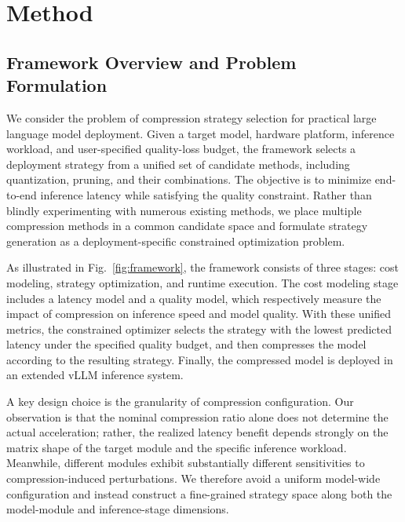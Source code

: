 \documentclass[letterpaper]{article} %
\begin{document}



\section{Method}
\subsection{Framework Overview and Problem Formulation}

We consider the problem of compression strategy selection for practical large language model deployment. Given a target model, hardware platform, inference workload, and user-specified quality-loss budget, the framework selects a deployment strategy from a unified set of candidate methods, including quantization, pruning, and their combinations. The objective is to minimize end-to-end inference latency while satisfying the quality constraint. Rather than blindly experimenting with numerous existing methods, we place multiple compression methods in a common candidate space and formulate strategy generation as a deployment-specific constrained optimization problem.

As illustrated in Fig.~\ref{fig:framework}, the framework consists of three stages: cost modeling, strategy optimization, and runtime execution. The cost modeling stage includes a latency model and a quality model, which respectively measure the impact of compression on inference speed and model quality. With these unified metrics, the constrained optimizer selects the strategy with the lowest predicted latency under the specified quality budget, and then compresses the model according to the resulting strategy. Finally, the compressed model is deployed in an extended vLLM inference system.

A key design choice is the granularity of compression configuration. Our observation is that the nominal compression ratio alone does not determine the actual acceleration; rather, the realized latency benefit depends strongly on the matrix shape of the target module and the specific inference workload. Meanwhile, different modules exhibit substantially different sensitivities to compression-induced perturbations. We therefore avoid a uniform model-wide configuration and instead construct a fine-grained strategy space along both the model-module and inference-stage dimensions.
\end{document}
